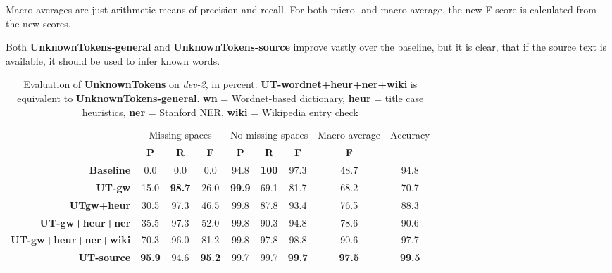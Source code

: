 \documentclass[a4paper,10pt]{scrartcl}
\theoremstyle{style}
\begin{document}
Macro-averages are just arithmetic means of precision and recall. For both micro- and macro-average, the new F-score is calculated from the new scores.

Both \textbf{UnknownTokens-general} and \textbf{UnknownTokens-source} improve vastly over the baseline, but it is clear, that if the source text is available, it should be used to infer known words.


\begin{table}
\begin{center}
\begin{tabular}{r|c|c|c|c|c|c|c|c|}
& \multicolumn{3}{c|}{Missing spaces} & \multicolumn{3}{c|}{No missing spaces} & Macro-average & Accuracy\\
& \textbf{P} & \textbf{R} & \textbf{F} & \textbf{P} & \textbf{R} & \textbf{F} & \textbf{F} & \\
\hline
\textbf{Baseline} & 0.0 & 0.0 & 0.0 & 94.8 & \textbf{100} & 97.3 & 48.7 & 94.8\\
\hline
\textbf{UT-gw} & 15.0 & \textbf{98.7} & 26.0 & \textbf{99.9} & 69.1 & 81.7 & 68.2 & 70.7\\
\hline
\textbf{UTgw+heur} & 30.5 & 97.3 & 46.5 & 99.8 & 87.8 & 93.4 & 76.5 & 88.3\\
\hline
\textbf{UT-gw+heur+ner} & 35.5 & 97.3 & 52.0 & 99.8 & 90.3 & 94.8 & 78.6 & 90.6\\
\hline
\textbf{UT-gw+heur+ner+wiki} & 70.3 & 96.0 & 81.2 & 99.8 & 97.8 & 98.8 & 90.6 & 97.7\\
\hline
\textbf{UT-source} & \textbf{95.9} & 94.6 & \textbf{95.2} & 99.7 & 99.7 & \textbf{99.7} & \textbf{97.5} & \textbf{99.5}\\
\end{tabular}
\end{center}
\caption{Evaluation of \textbf{UnknownTokens} on \textit{dev-2}, in percent. \textbf{UT-wordnet+heur+ner+wiki} is equivalent to \textbf{UnknownTokens-general}. \textbf{wn} = Wordnet-based dictionary, \textbf{heur} = title case heuristics, \textbf{ner} = Stanford NER, \textbf{wiki} = Wikipedia entry check}
\label{eval_unknowntokens}
\end{table}
\end{document}
